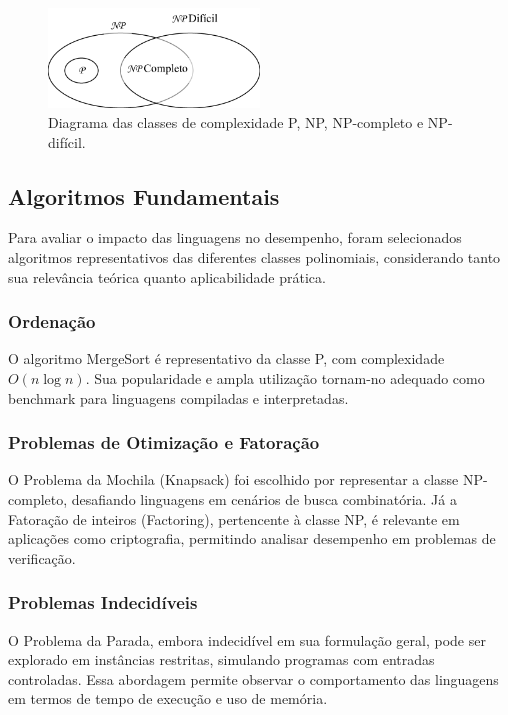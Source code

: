 \documentclass[12pt, a4paper]{article}
\begin{document}
\begin{figure}[H]
    \centering
    \includegraphics[width=0.5\textwidth]{img/relacaoDeConjuntos.png}
    \caption{Diagrama das classes de complexidade P, NP, NP-completo e NP-difícil.}
    \label{fig:complexidade}
\end{figure}

\subsection{Algoritmos Fundamentais}

Para avaliar o impacto das linguagens no desempenho, foram selecionados algoritmos representativos das diferentes classes polinomiais, considerando tanto sua relevância teórica quanto aplicabilidade prática.

\subsubsection{Ordenação}

O algoritmo MergeSort é representativo da classe P, com complexidade \( O(n \log n) \). Sua popularidade e ampla utilização tornam-no adequado como benchmark para linguagens compiladas e interpretadas.

\subsubsection{Problemas de Otimização e Fatoração}

O Problema da Mochila (Knapsack) foi escolhido por representar a classe NP-completo, desafiando linguagens em cenários de busca combinatória. Já a Fatoração de inteiros (Factoring), pertencente à classe NP, é relevante em aplicações como criptografia, permitindo analisar desempenho em problemas de verificação.

\subsubsection{Problemas Indecidíveis}

O Problema da Parada, embora indecidível em sua formulação geral, pode ser explorado em instâncias restritas, simulando programas com entradas controladas. Essa abordagem permite observar o comportamento das linguagens em termos de tempo de execução e uso de memória.
\end{document}
